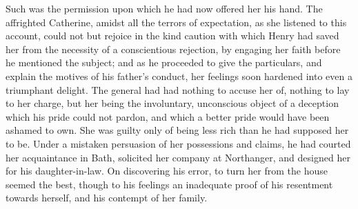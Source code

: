  Such was the permission upon which he had now offered her his hand. The affrighted Catherine, amidst all the terrors of expectation, as she listened to this account, could not but rejoice in the kind caution with which Henry had saved her from the necessity of a conscientious rejection, by engaging her faith before he mentioned the subject; and as he proceeded to give the particulars, and explain the motives of his father's conduct, her feelings soon hardened into even a triumphant delight. The general had had nothing to accuse her of, nothing to lay to her charge, but her being the involuntary, unconscious object of a deception which his pride could not pardon, and which a better pride would have been ashamed to own. She was guilty only of being less rich than he had supposed her to be. Under a mistaken persuasion of her possessions and claims, he had courted her acquaintance in Bath, solicited her company at Northanger, and designed her for his daughter-in-law. On discovering his error, to turn her from the house seemed the best, though to his feelings an inadequate proof of his resentment towards herself, and his contempt of her family. 

